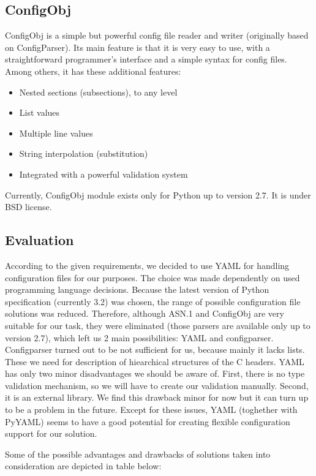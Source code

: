 \begin{description}
\subsection{ConfigObj}
ConfigObj is a simple but powerful config file reader and writer (originally
based on ConfigParser). Its main feature is that it is very easy to use, with
a straightforward programmer's interface and a simple syntax for config files.
Among others, it has these additional features:
\begin{itemize}
	\item Nested sections (subsections), to any level
	\item List values
	\item Multiple line values
	\item String interpolation (substitution)
	\item Integrated with a powerful validation system
\end{itemize}

\noindent Currently, ConfigObj module exists only for Python up to version
2.7. It is under BSD license.

\subsection{Evaluation}
According to the given requirements, we decided to use YAML for handling
configuration files for our purposes. The choice was made dependently on used
programming language decisions. Because the latest version of Python
specification (currently 3.2) was chosen, the range of possible configuration
file solutions was reduced. Therefore, although ASN.1 and ConfigObj are very
suitable for our task, they were eliminated (those parsers are available only
up to version 2.7), which left us 2 main possibilities: YAML and configparser.
Configparser turned out to be not sufficient for us, because mainly it lacks
lists. These we need for description of hiearchical structures of the C
headers. YAML has only two minor disadvantages we should be aware of. First,
there is no type validation mechanism, so we will have to create our validation
manually. Second, it is an external library. We find this drawback minor for
now but it can turn up to be a problem in the future. Except for these issues,
YAML (toghether with PyYAML) seems to have a good potential for creating
flexible configuration support for our solution.

Some of the possible advantages and drawbacks of solutions taken into
consideration are depicted in table below:


\end{description}
